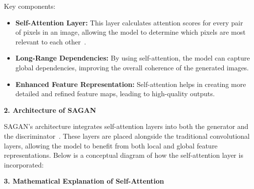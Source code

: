 Key components:
\begin{itemize}
    \item \textbf{Self-Attention Layer:} This layer calculates attention scores for every pair of pixels in an image, allowing the model to determine which pixels are most relevant to each other~\cite{wang2020attentive}.
    \item \textbf{Long-Range Dependencies:} By using self-attention, the model can capture global dependencies, improving the overall coherence of the generated images.
    \item \textbf{Enhanced Feature Representation:} Self-attention helps in creating more detailed and refined feature maps, leading to high-quality outputs.
\end{itemize}

\textbf{2. Architecture of SAGAN}

SAGAN's architecture integrates self-attention layers into both the generator and the discriminator~\cite{zhang2019self}. These layers are placed alongside the traditional convolutional layers, allowing the model to benefit from both local and global feature representations. Below is a conceptual diagram of how the self-attention layer is incorporated:

\begin{center}
\end{center}

\textbf{3. Mathematical Explanation of Self-Attention}

